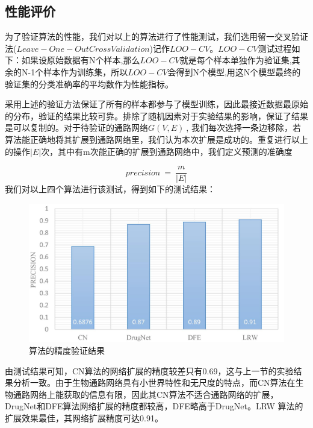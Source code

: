  \subsection{性能评价}
 为了验证算法的性能，我们对以上的算法进行了性能测试，我们选用留一交叉验证法($Leave-One-Out Cross Validation$)记作$LOO-CV$。$LOO-CV$测试过程如下：如果设原始数据有N个样本,那么$LOO-CV$就是每个样本单独作为验证集,其余的N-1个样本作为训练集，所以$LOO-CV$会得到N个模型,用这N个模型最终的验证集的分类准确率的平均数作为性能指标。

 采用上述的验证方法保证了所有的样本都参与了模型训练，因此最接近数据最原始的分布，验证的结果比较可靠。排除了随机因素对于实验结果的影响，保证了结果是可以复制的。对于待验证的通路网络$G( V,E) \ $, 我们每次选择一条边移除，若算法能正确地将其扩展到通路网络里，我们认为本次扩展是成功的。重复进行以上的操作$|E|$次，其中有m次能正确的扩展到通路网络中，我们定义预测的准确度

\begin{equation}
precision\ =\ \frac{m}{|E|}
\end{equation}
我们对以上四个算法进行该测试，得到如下的测试结果：
\begin{figure}[h]
\centering
\includegraphics[width = 1.0\textwidth]{precision}
\caption[precision]{算法的精度验证结果}
\label{precision}
\end{figure}

由测试结果可知，CN算法的网络扩展的精度较差只有0.69，这与上一节的实验结果分析一致。由于生物通路网络具有小世界特性和无尺度的特点，而CN算法在生物通路网络上能获取的信息有限，因此其CN算法不适合通路网络的扩展，DrugNet和DFE算法网络扩展的精度都较高，DFE略高于DrugNet。LRW 算法的扩展效果最佳，其网络扩展精度可达0.91。


